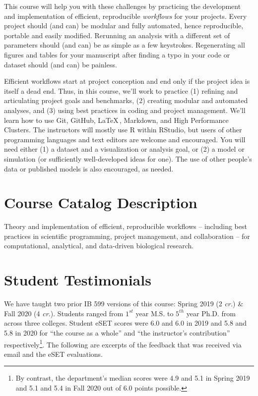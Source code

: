 \documentclass[10pt]{article}
\begin{document}
This course will help you with these challenges by practicing the development and implementation of 
efficient, reproducible \emph{workflows} for your projects.  
Every project should (and can) be modular and fully automated, hence reproducible, portable and easily 
modified.  
Rerunning an analysis with a different set of parameters should (and can) be as simple as a few 
keystrokes. 
Regenerating all figures and tables for your manuscript after finding a typo in your code or dataset 
should (and can) be painless.

Efficient workflows start at project conception and end only if the project idea is itself a dead end.  
Thus, in this course, we'll work to practice 
(1) refining and articulating project goals and benchmarks, 
(2) creating modular and automated analyses, and 
(3) using best practices in coding and project management. 
We'll learn how to use Git, GitHub, \LaTeX\,, Markdown, and High Performance Clusters.
The instructors will mostly use \textsf{R} within RStudio, but users of other programming languages and 
text editors are welcome and encouraged.  
You will need either 
(1) a dataset and a visualization or analysis goal, or 
(2) a model or simulation (or sufficiently well-developed ideas for one).
The use of other people's data or published models is also encouraged, as needed.

\section*{Course Catalog Description}
Theory and implementation of efficient, reproducible workflows -- including best practices in scientific 
programming, project management, and collaboration --  for computational, analytical, and data-driven 
biological research.

\section*{Student Testimonials}
We have taught two prior IB 599 versions of this course: Spring 2019 (2 \emph{cr.}) \& Fall 2020 (4 
\emph{cr.}).
Students ranged from $1^{st}$ year M.S. to $5^{th}$ year Ph.D. from across three colleges. 
Student eSET scores were 6.0 and 6.0 in 2019 and 5.8 and 5.8 in 2020 for ``the course as a whole'' and 
``the instructor's contribution'' respectively\footnote{By contrast, the department's median scores were 
4.9 and 5.1 in Spring 2019 and 5.1 and 5.4 in Fall 2020 out of 6.0 points possible.}.
The following are excerpts of the feedback that was received via email and the eSET evaluations.
\end{document}
